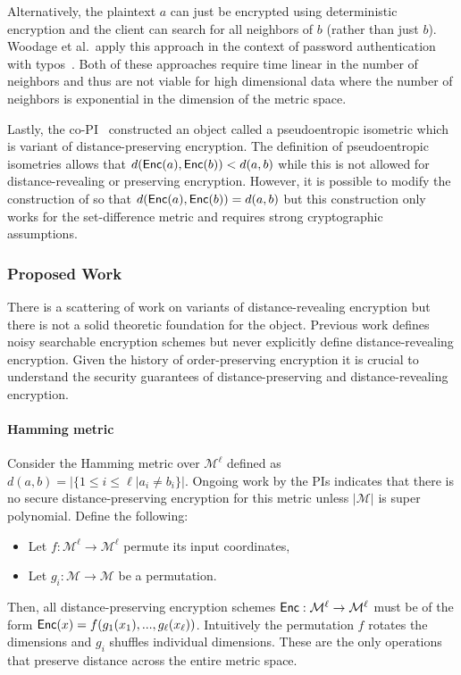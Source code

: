 Alternatively, the plaintext $a$ can just be encrypted using deterministic encryption and the client can search for all neighbors of $b$ (rather than just $b$).  Woodage et al.~apply this approach in the context of password authentication with typos~\cite{C:WCDJR17}.  Both of these approaches require time linear in the number of neighbors and thus are not viable for high dimensional data where the number of neighbors is exponential in the dimension of the metric space.

Lastly, the co-PI~\cite{EPRINT:ABCFG16} constructed an object called a pseudoentropic isometric which is variant of distance-preserving encryption.  The definition of pseudoentropic isometries allows that $d(\mathsf{Enc}(a), \mathsf{Enc}(b)) <d(a,b)$ while this is not allowed for distance-revealing or preserving encryption.  However, it is possible to modify the construction of \cite{EPRINT:ABCFG16} so that $d(\mathsf{Enc}(a), \mathsf{Enc}(b)) = d(a,b)$ but this construction only works for the set-difference metric and requires strong cryptographic assumptions.

\subsubsection{Proposed Work}
There is a scattering of work on variants of distance-revealing encryption but there is not a solid theoretic foundation for the object.  Previous work defines noisy searchable encryption schemes but never explicitly define distance-revealing encryption.   Given the history of order-preserving encryption it is crucial to understand the security guarantees of distance-preserving and distance-revealing encryption. %

 \paragraph{Hamming metric} Consider the Hamming metric over $\mathcal{M}^\ell$ defined as $d(a,b) = | \{ 1\le i\le \ell | a_i \neq b_i\}|$.  Ongoing work by the PIs indicates that there is no secure distance-preserving encryption for this metric unless $|\mathcal{M}|$ is super polynomial.  Define the following: 
\begin{itemize}
\item Let $f: \mathcal{M}^\ell \rightarrow \mathcal{M}^\ell$ permute its input coordinates, 
\item Let $g_i: \mathcal{M}\rightarrow \mathcal{M}$ be a permutation.
\end{itemize}
Then, all distance-preserving encryption schemes $\mathsf{Enc}: \mathcal{M}^\ell\rightarrow \mathcal{M}^\ell$ must be of the form $\mathsf{Enc}(x) = f(g_1(x_1),..., g_\ell(x_\ell))$.  Intuitively the permutation $f$ rotates the dimensions and $g_i$ shuffles individual dimensions.  These are the only operations that preserve distance across the entire metric space.

